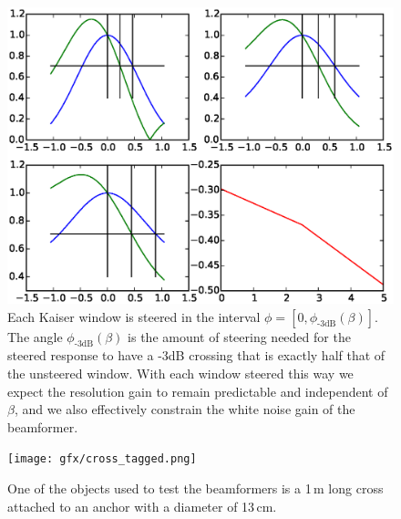 \documentclass[10pt,journal,draftclsnofoot,onecolumn]{IEEEtran}
\let\MYoriglatexcaption\caption               %
\renewcommand{\caption}[2][\relax]{\MYoriglatexcaption[#2]{#2}}
\newcommand\1{\vec 1}
\begin{document}
\begin{figure}[tbp]%
\includegraphics[width=\linewidth]{gfx/calc_kaiser_3dB.eps}%
\caption{Each Kaiser window is steered in the interval $\phi=[0, \phi_{\text{-3dB}}(\beta)]$. The angle $\phi_{\text{-3dB}}(\beta)$ is the amount of steering needed for the steered response to have a -3dB crossing that is exactly half that of the unsteered window. With each window steered this way we expect the resolution gain to remain predictable and independent of $\beta$, and we also effectively constrain the white noise gain of the beamformer.}\label{windows_steering}
\end{figure}

\begin{figure}[tbp]%
\texttt{[image: gfx/cross\_tagged.png]}%
\caption{One of the objects used to test the beamformers is a 1\,m long cross attached to an anchor with a diameter of 13\,cm.}\label{cross}
\end{figure}

\setcounter{topnumber}{1}
\setcounter{dbltopnumber}{1}
\end{document}
